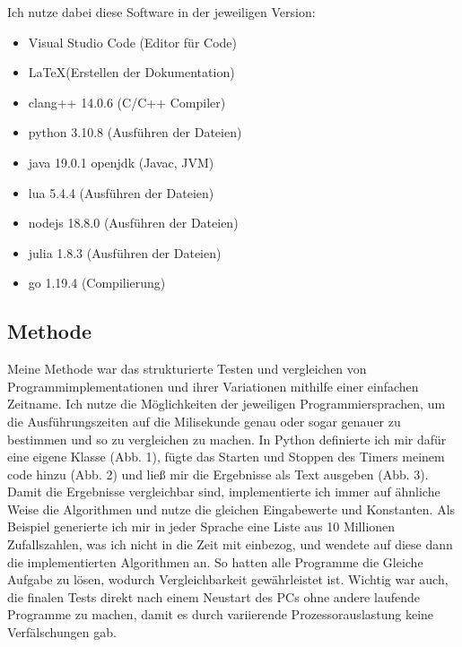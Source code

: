 \documentclass[12pt,a4paper]{article}
\begin{document}
Ich nutze dabei diese Software in der jeweiligen Version:
\begin{itemize}
    \item Visual Studio Code (Editor für Code)
    \item \LaTeX (Erstellen der Dokumentation)
    \item clang++ 14.0.6 (C/C++ Compiler)
    \item python 3.10.8 (Ausführen der Dateien)
    \item java 19.0.1 openjdk (Javac, JVM)
    \item lua 5.4.4 (Ausführen der Dateien)
    \item nodejs 18.8.0 (Ausführen der Dateien)
    \item julia 1.8.3 (Ausführen der Dateien)
    \item go 1.19.4 (Compilierung)
\end{itemize}


\subsection{Methode}

Meine Methode war das strukturierte Testen und vergleichen von Programmimplementationen und ihrer 
Variationen mithilfe einer einfachen Zeitname. Ich nutze die Möglichkeiten der jeweiligen Programmiersprachen, 
um die Ausführungszeiten auf die Milisekunde genau oder sogar genauer zu bestimmen und 
so zu vergleichen zu machen. In Python definierte ich mir dafür eine eigene Klasse (Abb. 1), fügte das Starten und Stoppen
des Timers meinem code hinzu (Abb. 2) und ließ mir die Ergebnisse als Text ausgeben (Abb. 3).
Damit die Ergebnisse vergleichbar sind, implementierte ich immer auf ähnliche Weise die Algorithmen und
nutze die gleichen Eingabewerte und Konstanten.
Als Beispiel generierte ich mir in jeder Sprache eine Liste aus 10 Millionen Zufallszahlen,
was ich nicht in die Zeit mit einbezog, und wendete auf diese dann die implementierten Algorithmen an.
So hatten alle Programme die Gleiche Aufgabe zu lösen, wodurch Vergleichbarkeit gewährleistet ist.
Wichtig war auch, die finalen Tests direkt nach einem Neustart des PCs ohne andere laufende Programme
zu machen, damit es durch variierende Prozessorauslastung keine Verfälschungen gab. 
\end{document}
